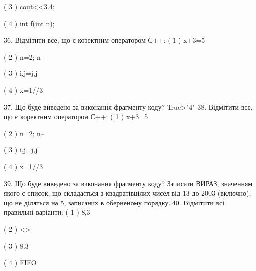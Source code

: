 \documentclass[11pt]{article}
\begin{document}
( 3 ) cout<<3.4;

( 4 ) int f(int n);

36. Відмітити все, що є коректним оператором С++:
( 1 ) x+3=5

( 2 ) n=2; n--

( 3 ) i,j=j,j

( 4 ) x=1//3

37. Що буде виведено за виконання фрагменту коду?
True>"4"
38. Відмітити все, що є коректним оператором С++:
( 1 ) x+3=5

( 2 ) n=2; n--

( 3 ) i,j=j,j

( 4 ) x=1//3

39. Що буде виведено за виконання фрагменту коду?
Записати ВИРАЗ, значенням якого є список, що складається з квадратівцілих чисел від 13 до 2003 (включно), що не діляться на 5, записаних в оберненому порядку.
40. Відмітити всі правильні варіанти:
( 1 ) 8,3

( 2 ) <>

( 3 ) 8.3

( 4 ) FIFO









































\newpage
\end{document}
